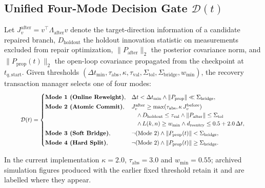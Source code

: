 \documentclass[journal]{IEEEtran}
\begin{document}
\subsection{Unified Four-Mode Decision Gate \texorpdfstring{$\mathcal{D}(t)$}{D(t)}}
Let $J_v^{\mathrm{after}} = v^\top \Lambda_{\mathrm{after}} v$ denote the target-direction information of a candidate repaired branch, $D_{\mathrm{holdout}}$ the holdout innovation statistic on measurements excluded from repair optimization, $\|P_{\mathrm{after}}\|_2$ the posterior covariance norm, and $\|P_{\mathrm{prop}}(t)\|_2$ the open-loop covariance propagated from the checkpoint at $t_{q,\mathrm{start}}$. Given thresholds $(\Delta t_{\min}, \tau_{\mathrm{abs}}, \kappa, \tau_{\mathrm{val}}, \Sigma_{\mathrm{tol}}, \Sigma_{\mathrm{bridge}}, w_{\min})$, the recovery transaction manager selects one of four modes:
\begin{equation}
\resizebox{0.91\columnwidth}{!}{$
\mathcal{D}(t) = \begin{cases}
\textbf{Mode 1 (Online Reweight)}, & \Delta t < \Delta t_{\min} \wedge \|P_{\mathrm{prop}}\| \ll \Sigma_{\mathrm{bridge}}, \\[2pt]
\textbf{Mode 2 (Atomic Commit)}, & J_v^{\mathrm{after}} \ge \max(\tau_{\mathrm{abs}}, \kappa\, J_v^{\mathrm{before}}) \\
                                 & \quad \wedge\, D_{\mathrm{holdout}} \le \tau_{\mathrm{val}} \wedge \|P_{\mathrm{after}}\| \le \Sigma_{\mathrm{tol}} \\
                                 & \quad \wedge\, L(k,n) \ge w_{\min} \wedge d_{\mathrm{reentry}} \le 0.5+2.0\,\Delta t, \\[2pt]
\textbf{Mode 3 (Soft Bridge)}, & \neg(\text{Mode 2}) \wedge \|P_{\mathrm{prop}}(t)\| < \Sigma_{\mathrm{bridge}}, \\[2pt]
\textbf{Mode 4 (Hard Split)}, & \neg(\text{Mode 2}) \wedge \|P_{\mathrm{prop}}(t)\| \ge \Sigma_{\mathrm{bridge}}.
\end{cases}
$}
\label{eq:four_mode}
\end{equation}

\noindent In the current implementation $\kappa=2.0$, $\tau_{\mathrm{abs}}=3.0$ and $w_{\min}=0.55$; archived simulation figures produced with the earlier fixed threshold retain it and are labelled where they appear.
\end{document}
